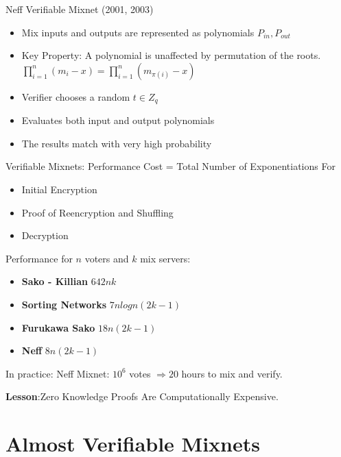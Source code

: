 \documentclass{beamer}
\newcommand*{\addsp}{\usebeamertemplate*{section page1}}
\begin{document}
\begin{frame}[allowframebreaks]{Neff Verifiable Mixnet (2001, 2003)}
\begin{itemize}
\item Mix inputs and outputs are represented as polynomials $P_{in}, P_{out}$
\item Key Property: A polynomial is unaffected by permutation of the roots.
$ \prod_{i=1}^n (m_i - x) = \prod_{i=1}^n (m_{\pi(i)} - x) $
\item Verifier chooses a random $t \in Z_q$
\item Evaluates both input and output polynomials
\item The results match with very high probability
\end{itemize}
\end{frame}

\begin{frame}{Verifiable Mixnets: Performance}
Cost = Total Number of Exponentiations For
\begin{itemize}
\item Initial Encryption
\item Proof of Reencryption and Shuffling
\item Decryption
\end{itemize}
Performance for $n$ voters and $k$ mix servers:
\begin{itemize}
\item \textbf{Sako - Killian} $642nk$
\item \textbf{Sorting Networks}  $7nlogn(2k-1)$
\item \textbf{Furukawa Sako} $18n(2k-1)$
\item \textbf{Neff} $8n(2k-1)$
\end{itemize}
In practice: Neff Mixnet: $10^6$ votes $ \Rightarrow 20$ hours to mix and verify. \\
\begin{center}
\textbf{Lesson}:Zero Knowledge Proofs Are Computationally Expensive.
\end{center}
\end{frame}

\section{Almost Verifiable Mixnets}
\begin{frame}
\addsp
\end{frame}
\end{document}
